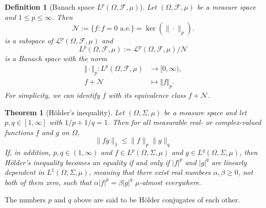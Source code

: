 \documentclass{report}
\newtheorem{definition}{Definition}[section]
\newtheorem{theorem}{Theorem}[section]
\theoremstyle{nonumberplain}
\begin{document}
\begin{definition}[Banach space $L^p(\Omega, \mathcal{F}, \mu)$] Let $(\Omega, \mathcal{F}, \mu)$ be a measure space and $1\le p \leq\infty$. Then
	\[
	\mathcal{N}:=\{f: f=0\text{ a.e.}\}=\operatorname{ker}\left(\|\cdot\|_{p}\right).
	\]
	is a subspace of $\mathcal{L}^{p}(\Omega, \mathcal{F}, \mu)$ and
	\[
	L^{p}(\Omega, \mathcal{F}, \mu):=\mathcal{L}^{p}(\Omega, \mathcal{F}, \mu)/\mathcal{N}
	\]
	is a Banach space with the norm
	\begin{align*}
	\Vert \cdot\Vert_p:L^{p}(\Omega, \mathcal{F}, \mu)&\longrightarrow [0,\infty),\\
	f+\mathcal{N} &\longmapsto \Vert f\Vert_p.
	\end{align*}
    For simplicity, we can identify $f$ with its equivalence class $f+\mathcal{N}$.
\end{definition}

\begin{theorem}[Hölder's inequality]
	Let $(\Omega, \Sigma, \mu)$ be a measure space and let $p, q \in[1, \infty]$ with $1 / p+1 / q=1$. Then for all measurable real- or complex-valued functions $f$ and $g$ on $\Omega$,
\[
\|f g\|_{1} \leq\|f\|_{p}\|g\|_{q}
\]
If, in addition, $p, q \in(1, \infty)$ and $f \in L^{p}(\Omega, \Sigma, \mu)$ and $g \in L^{q}(\Omega, \Sigma, \mu)$, then Hölder's inequality becomes an equality if and only if $|f|^{p}$ and $|g|^{q}$ are linearly dependent in $L^{1}(\Omega, \Sigma, \mu)$, meaning that there exist real numbers $\alpha, \beta \geq 0$, not both of them zero, such that $\alpha|f|^{p}=\beta|g|^{q}$ $\mu$-almost everywhere.
\end{theorem}

The numbers $p$ and $q$ above are said to be Hölder conjugates of each other. 
\end{document}
